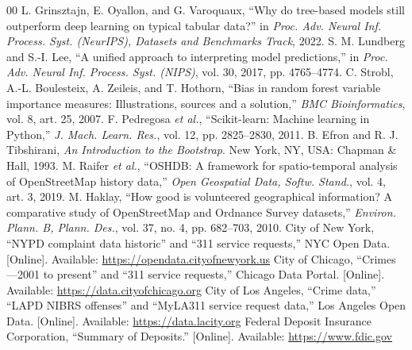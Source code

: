 \documentclass[conference]{IEEEtran}
\begin{document}
\begin{thebibliography}{00}
 L. Grinsztajn, E. Oyallon, and G. Varoquaux, ``Why do tree-based models still outperform
deep learning on typical tabular data?'' in \textit{Proc. Adv. Neural Inf. Process. Syst. (NeurIPS), Datasets and
Benchmarks Track}, 2022.
 S. M. Lundberg and S.-I. Lee, ``A unified approach to interpreting model predictions,'' in
\textit{Proc. Adv. Neural Inf. Process. Syst. (NIPS)}, vol. 30, 2017, pp. 4765--4774.
 C. Strobl, A.-L. Boulesteix, A. Zeileis, and T. Hothorn, ``Bias in random forest variable
importance measures: Illustrations, sources and a solution,'' \textit{BMC Bioinformatics}, vol. 8, art. 25, 2007.
 F. Pedregosa \textit{et al.}, ``Scikit-learn: Machine learning in Python,''
\textit{J. Mach. Learn. Res.}, vol. 12, pp. 2825--2830, 2011.
 B. Efron and R. J. Tibshirani, \textit{An Introduction to the Bootstrap}. New York, NY, USA:
Chapman \& Hall, 1993.
 M. Raifer \textit{et al.}, ``OSHDB: A framework for spatio-temporal analysis of OpenStreetMap
history data,'' \textit{Open Geospatial Data, Softw. Stand.}, vol. 4, art. 3, 2019.
 M. Haklay, ``How good is volunteered geographical information? A comparative study of
OpenStreetMap and Ordnance Survey datasets,'' \textit{Environ. Plann. B, Plann. Des.}, vol. 37, no. 4,
pp. 682--703, 2010.
 City of New York, ``NYPD complaint data historic'' and ``311 service requests,'' NYC Open Data.
[Online]. Available: \url{https://opendata.cityofnewyork.us}
 City of Chicago, ``Crimes---2001 to present'' and ``311 service requests,'' Chicago Data Portal.
[Online]. Available: \url{https://data.cityofchicago.org}
 City of Los Angeles, ``Crime data,'' ``LAPD NIBRS offenses'' and ``MyLA311 service request data,''
Los Angeles Open Data. [Online]. Available: \url{https://data.lacity.org}
 Federal Deposit Insurance Corporation, ``Summary of Deposits.'' [Online]. Available:
\url{https://www.fdic.gov}
\end{thebibliography}
\end{document}
